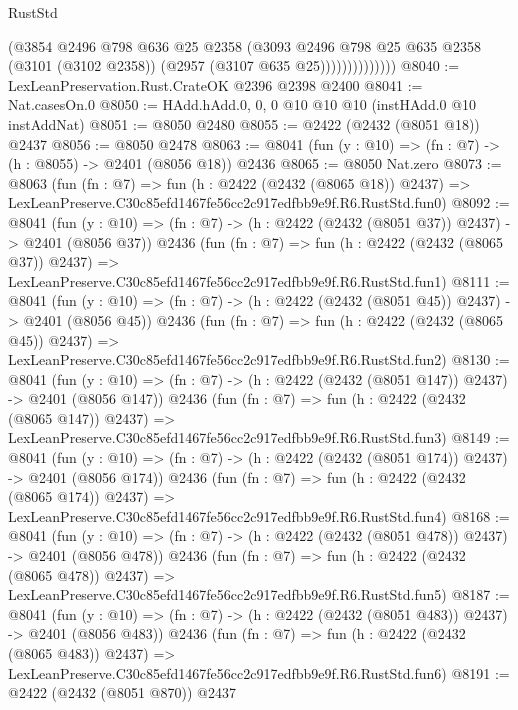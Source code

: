 \begin{lexlean}{RustStd}
\begin{coremodule}
                        (@3854
                          @2496
                          @798
                          @636
                          @25
                          @2358
                          (@3093
                            @2496
                            @798
                            @25
                            @635
                            @2358
                            (@3101 (@3102 @2358))
                            (@2957 (@3107 @635 @25))))))))))))))
@8040 := LexLeanPreservation.Rust.CrateOK @2396 @2398 @2400
@8041 := Nat.casesOn.{0}
@8050 := HAdd.hAdd.{0, 0, 0} @10 @10 @10 (instHAdd.{0} @10 instAddNat)
@8051 := @8050 @2480
@8055 := @2422 (@2432 (@8051 @18)) @2437
@8056 := @8050 @2478
@8063 := @8041 (fun (y : @10) => (fn : @7) -> (h : @8055) -> @2401 (@8056 @18)) @2436
@8065 := @8050 Nat.zero
@8073 := @8063
    (fun (fn : @7) =>
    fun (h : @2422 (@2432 (@8065 @18)) @2437) =>
    LexLeanPreserve.C30c85efd1467fe56cc2c917edfbb9e9f.R6.RustStd.fun0)
@8092 := @8041
    (fun (y : @10) => (fn : @7) -> (h : @2422 (@2432 (@8051 @37)) @2437) -> @2401 (@8056 @37))
    @2436
    (fun (fn : @7) =>
    fun (h : @2422 (@2432 (@8065 @37)) @2437) =>
    LexLeanPreserve.C30c85efd1467fe56cc2c917edfbb9e9f.R6.RustStd.fun1)
@8111 := @8041
    (fun (y : @10) => (fn : @7) -> (h : @2422 (@2432 (@8051 @45)) @2437) -> @2401 (@8056 @45))
    @2436
    (fun (fn : @7) =>
    fun (h : @2422 (@2432 (@8065 @45)) @2437) =>
    LexLeanPreserve.C30c85efd1467fe56cc2c917edfbb9e9f.R6.RustStd.fun2)
@8130 := @8041
    (fun (y : @10) => (fn : @7) -> (h : @2422 (@2432 (@8051 @147)) @2437) -> @2401 (@8056 @147))
    @2436
    (fun (fn : @7) =>
    fun (h : @2422 (@2432 (@8065 @147)) @2437) =>
    LexLeanPreserve.C30c85efd1467fe56cc2c917edfbb9e9f.R6.RustStd.fun3)
@8149 := @8041
    (fun (y : @10) => (fn : @7) -> (h : @2422 (@2432 (@8051 @174)) @2437) -> @2401 (@8056 @174))
    @2436
    (fun (fn : @7) =>
    fun (h : @2422 (@2432 (@8065 @174)) @2437) =>
    LexLeanPreserve.C30c85efd1467fe56cc2c917edfbb9e9f.R6.RustStd.fun4)
@8168 := @8041
    (fun (y : @10) => (fn : @7) -> (h : @2422 (@2432 (@8051 @478)) @2437) -> @2401 (@8056 @478))
    @2436
    (fun (fn : @7) =>
    fun (h : @2422 (@2432 (@8065 @478)) @2437) =>
    LexLeanPreserve.C30c85efd1467fe56cc2c917edfbb9e9f.R6.RustStd.fun5)
@8187 := @8041
    (fun (y : @10) => (fn : @7) -> (h : @2422 (@2432 (@8051 @483)) @2437) -> @2401 (@8056 @483))
    @2436
    (fun (fn : @7) =>
    fun (h : @2422 (@2432 (@8065 @483)) @2437) =>
    LexLeanPreserve.C30c85efd1467fe56cc2c917edfbb9e9f.R6.RustStd.fun6)
@8191 := @2422 (@2432 (@8051 @870)) @2437

\end{coremodule}
\end{lexlean}
